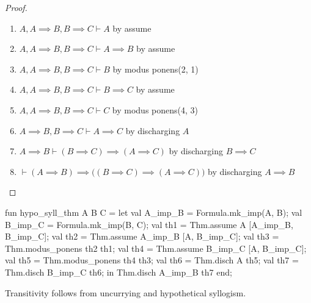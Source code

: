 \begin{proof}
\begin{enumerate}
\item $A,A\implies B, B\implies C\vdash A$ by assume
\item $A,A\implies B, B\implies C\vdash A\implies B$ by assume
\item $A,A\implies B, B\implies C\vdash B$ by modus ponens(2, 1)
\item $A,A\implies B, B\implies C\vdash B\implies C$ by assume
\item $A,A\implies B, B\implies C\vdash C$ by modus ponens(4, 3)
\item $A\implies B, B\implies C\vdash A\implies C$ by discharging $A$
\item $A\implies B\vdash(B\implies C)\implies(A\implies C)$ by discharging $B\implies C$
\item $\vdash(A\implies B)\implies\bigl((B\implies C)\implies(A\implies C)\bigr)$ by discharging $A\implies B$\qedhere
\end{enumerate}
\end{proof}

\nwenddocs{}\endmoddef\nwstartdeflinemarkup{}\nwenddeflinemarkup
fun hypo_syll_thm A B C =
  let
    val A_imp_B = Formula.mk_imp(A, B);
    val B_imp_C = Formula.mk_imp(B, C);
    val th1 = Thm.assume A [A_imp_B, B_imp_C];
    val th2 = Thm.assume A_imp_B [A, B_imp_C];
    val th3 = Thm.modus_ponens th2 th1;
    val th4 = Thm.assume B_imp_C [A, B_imp_C];
    val th5 = Thm.modus_ponens th4 th3;
    val th6 = Thm.disch A th5;
    val th7 = Thm.disch B_imp_C th6;
  in
    Thm.disch A_imp_B th7
  end;
\eatline
{}\nwendcode{}\nwdocspar
\begin{node}
Transitivity follows from uncurrying and hypothetical syllogism.
\end{node}

